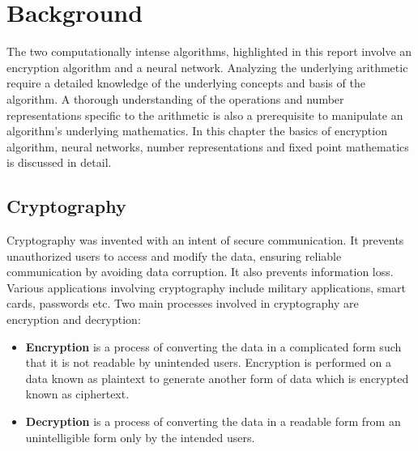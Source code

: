 \chapter{Background}
\label{Chapter2}
The two computationally intense algorithms, highlighted in this report involve an encryption algorithm and a neural network. Analyzing the underlying arithmetic require a detailed knowledge of the underlying concepts and basis of the algorithm. 
A thorough understanding of the operations and number representations specific to the arithmetic is also a prerequisite to manipulate an algorithm's underlying mathematics. 
In this chapter the basics of encryption algorithm, neural networks, number representations and fixed point mathematics is discussed in detail.

\section{Cryptography}
Cryptography was invented with an intent of secure communication. It prevents unauthorized users to access and modify the data, ensuring reliable communication by avoiding data corruption. It also prevents information loss. Various applications involving cryptography include military applications, smart cards, passwords etc.
Two main processes involved in cryptography are encryption and decryption:

\begin{itemize}
\label{Encryption}
\item \textbf{Encryption} is a process of converting the data in a complicated form such that it is not readable by unintended users. Encryption is performed on a data known as plaintext to generate another form of data which is encrypted known as ciphertext.
\label{Decryption}
\item \textbf{Decryption} is a process of converting the data in a readable form from an unintelligible form only by the intended users.
\end{itemize}

